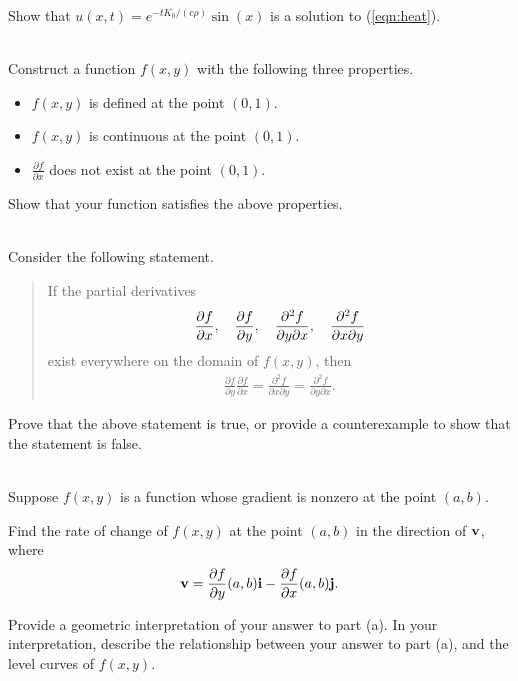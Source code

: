 Show that $u(x,t) = e^{-tK_0/(c\rho)}\sin(x)$ is a solution to (\ref{eqn:heat}).
\item  {}\\ 
Construct a function $f(x,y)$ with the following three properties.
\begin{itemize}
\item $f(x,y)$ is defined at the point $(0,1)$.
\item $f(x,y)$ is continuous at the point $(0,1)$.
\item  $\frac{\partial f}{\partial x}$ does not exist at the point $(0,1)$.
\end{itemize}
Show that your function satisfies the above properties.
\item  {}\\ 
Consider the following statement.
\begin{quote}
If the partial derivatives 
\begin{align*}
   \frac{\partial f}{\partial x}, \quad \frac{\partial f}{\partial y}, \quad \frac{\partial^2 f}{\partial y \partial x}, \quad \frac{\partial^2 f}{\partial x \partial y}
\end{align*}
exist everywhere on the domain of $f(x,y)$, then 
\begin{align*}
   \frac{\partial f}{\partial y}\frac{\partial f}{\partial x} = \frac{\partial^2 f}{\partial x \partial y} = \frac{\partial^2 f}{\partial y \partial x}.
\end{align*}
\end{quote}
Prove that the above statement is true, or provide a counterexample to show that the statement is false. 
\item  {}\\ 
Suppose $f(x,y)$ is a function whose gradient is nonzero at the point $(a,b)$. 
\BEN
\item Find the rate of change of $f(x,y)$ at the point $(a,b)$ in the direction of $\mathbf{v}$, where
\begin{align*}
  \mathbf{v} = \frac{\partial f}{\partial y}(a,b)\mathbf{i}-\frac{\partial f}{\partial x}(a,b)\mathbf{j}.
\end{align*}
\item Provide a geometric interpretation of your answer to part (a). In your interpretation, describe the relationship between your answer to part (a), and the level curves of $f(x,y)$. 
\EEN
